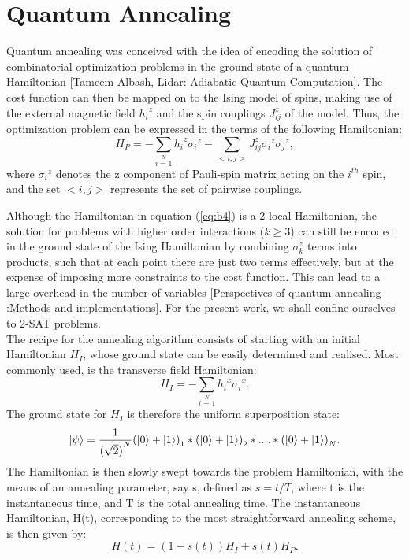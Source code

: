 \documentclass[12]{article}
\begin{document}
\section{Quantum Annealing}
Quantum annealing was conceived with the idea of encoding the solution of combinatorial optimization problems in the ground state of a quantum Hamiltonian [Tameem Albash, Lidar: Adiabatic Quantum Computation]. 
The cost function can then be mapped on to the Ising model of spins, making use of the external magnetic field ${h_i}^z$ and the spin couplings ${J_{ij}^z}$ of the model. Thus, the optimization problem can be expressed in the terms of the following Hamiltonian:
\begin{equation}
H_P=-\sum\limits_{i=1}\limits^{N}{h_i}^z{\sigma_i}^z - \sum\limits_{<i,j>}{J_{ij}^z} {\sigma_i}^z{\sigma_j}^z, \label{eq:b4}
\end{equation}
where ${\sigma_i}^z$ denotes the z component of Pauli-spin matrix acting on the $i^{th}$ spin, and the set $<i,j>$ represents the set of pairwise couplings.

Although the Hamiltonian in equation (\ref{eq:b4}) is a 2-local Hamiltonian, the solution for problems with higher order interactions ($k \geq 3$) can still be encoded in the ground state of the Ising Hamiltonian by combining $\sigma_k^z$ terms into products, such that at each point there are just two terms effectively, but at the expense of imposing more constraints to the cost function. This can lead to a large overhead in the number of variables [Perspectives of quantum annealing :Methods and implementations]. For the present work, we shall confine ourselves to 2-SAT problems. \\

The recipe for the annealing algorithm consists of starting with an initial Hamiltonian $H_I$, whose ground state can be easily determined and realised. Most commonly used, is the transverse field Hamiltonian: 
\begin{equation}
H_I=-\sum\limits_{i=1}\limits^{N}{h_i}^x{\sigma_i}^x. \label{eq:b5}
\end{equation}
The ground state for $H_I$ is therefore the uniform superposition state: 
\begin{equation}
\ket{\psi}=\frac{1}{{(\sqrt{2})}^N}{(\ket{0}+\ket{1})}_1*{(\ket{0}+\ket{1})}_2*....*{(\ket{0}+\ket{1})}_N. \label{eq:b6}
\end{equation}
The Hamiltonian is then slowly swept towards the problem Hamiltonian, with the means of an annealing parameter, say s, defined as $s=t/T$, where t is the instantaneous time, and T is the total annealing time. The instantaneous Hamiltonian, H(t), corresponding to the most straightforward annealing scheme, is then given by: 
\begin{equation}
H(t)= (1-s(t))H_I + s(t)H_P. \label{eq:b7}
\end{equation}
\end{document}
